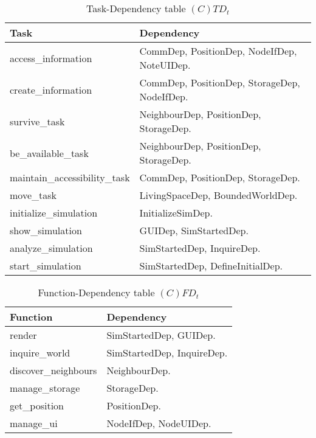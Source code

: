 \begin{table}[H]
	\centering
	\begin{tabular}{|p{5cm}|p{7cm}|}
			\hline
			\textbf{Task} & \textbf{Dependency} \\
			\hline
			access\_information & CommDep, PositionDep, NodeIfDep, NoteUIDep. \\
			\hline
			create\_information & CommDep, PositionDep, StorageDep, NodeIfDep. \\
			\hline
			survive\_task & NeighbourDep, PositionDep, StorageDep. \\
			\hline
			be\_available\_task &  NeighbourDep, PositionDep, StorageDep. \\
			\hline
			maintain\_accessibility\_task & CommDep, PositionDep, StorageDep. \\
			\hline
			move\_task & LivingSpaceDep, BoundedWorldDep. \\
			\hline
			initialize\_simulation & InitializeSimDep. \\
			\hline
			show\_simulation & GUIDep, SimStartedDep. \\
			\hline
			analyze\_simulation & SimStartedDep, InquireDep. \\
			\hline
			start\_simulation & SimStartedDep, DefineInitialDep. \\
			\hline
		\end{tabular}
	\caption{Task-Dependency table $(C)TD_t$}
	\label{tab:ctdt}
\end{table}

\begin{table}[H]
	\centering
	\begin{tabular}{|p{5cm}|p{7cm}|}
			\hline
			\textbf{Function} & \textbf{Dependency} \\
			\hline
			render & SimStartedDep, GUIDep. \\
			\hline
			inquire\_world & SimStartedDep, InquireDep. \\
			\hline
			discover\_neighbours & NeighbourDep. \\
			\hline
			manage\_storage & StorageDep. \\
			\hline
			get\_position & PositionDep. \\
			\hline
			manage\_ui & NodeIfDep, NodeUIDep. \\
			\hline
		\end{tabular}
	\caption{Function-Dependency table $(C)FD_t$}
	\label{tab:cfdt}
\end{table}

